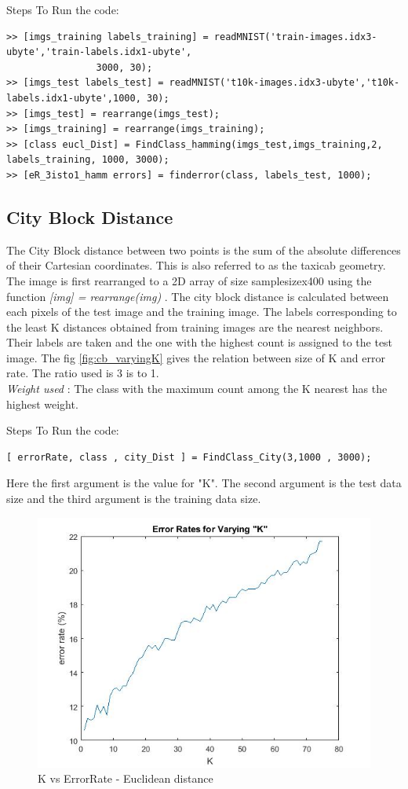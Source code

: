 \documentclass[10pt, letterpaper]{article}
\begin{document}
Steps To Run the code:
\begin{verbatim}
>> [imgs_training labels_training] = readMNIST('train-images.idx3-ubyte','train-labels.idx1-ubyte',
				3000, 30);
>> [imgs_test labels_test] = readMNIST('t10k-images.idx3-ubyte','t10k-labels.idx1-ubyte',1000, 30);
>> [imgs_test] = rearrange(imgs_test);
>> [imgs_training] = rearrange(imgs_training);
>> [class eucl_Dist] = FindClass_hamming(imgs_test,imgs_training,2, labels_training, 1000, 3000);
>> [eR_3isto1_hamm errors] = finderror(class, labels_test, 1000);
\end{verbatim}



\subsection{City Block Distance}
The City Block distance between two points is the sum of the absolute differences of their Cartesian coordinates. This is also referred to as the taxicab geometry. The image is first rearranged to a 2D array of size samplesizex400 using the function {\sl [img] = rearrange(img)} . The city block distance is calculated between each pixels of the test image and the training image. The labels corresponding to the least K distances obtained from training images are  the nearest neighbors. Their labels are taken and the one with the highest count is assigned to the test image.  The fig \ref{fig:cb_varyingK} gives the relation between size of K and error rate. The ratio used is 3 is to 1.
\\{\sl Weight used} : The class with the maximum count among the K nearest has the highest weight.

Steps To Run the code:
\begin{verbatim}
[ errorRate, class , city_Dist ] = FindClass_City(3,1000 , 3000);
\end{verbatim}
Here the first argument is the value for "K". The second argument is the test data size and the third argument is the training data size.


 \begin{figure}
    \includegraphics[width=\linewidth]{images/3isto1Ratio_varyingK}
    \caption{ K vs ErrorRate - Euclidean distance}
    \label{fig:3isto1Ratio_varyingK}
    \end{figure}
    
\end{document}
